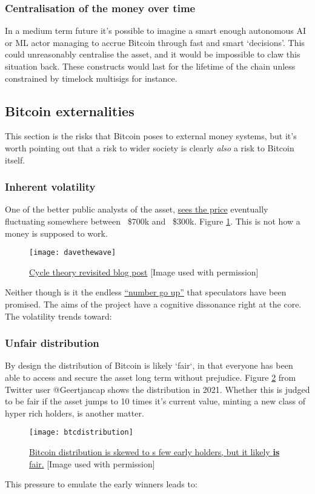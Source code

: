 \subsubsection{Centralisation of the money over time}
In a medium term future it's possible to imagine a smart enough autonomous AI or ML actor managing to accrue Bitcoin through fast and smart `decisions'. This could unreasonably centralise the asset, and it would be impossible to claw this situation back. These constructs would last for the lifetime of the chain unless constrained by timelock multisigs for instance. 
\subsection{Bitcoin externalities}
This section is the risks that Bitcoin poses to external money systems, but it's worth pointing out that a risk to wider society is clearly \textit{also} a risk to Bitcoin itself.
\subsubsection{Inherent volatility}
One of the better public analysts of the asset, \href{https://twitter.com/davthewave/status/1072441941390974982/photo/1}{sees the price} eventually fluctuating somewhere between ~\$700k and ~\$300k.  Figure \ref{fig:davethewave}. This is not how a money is supposed to work.  

\begin{figure}
  \centering
    \texttt{[image: davethewave]}
  \caption{\href{https://davethewave.substack.com/p/cycle-theory-revisited?s=r}{Cycle theory revisited blog post} [Image used with permission]}
  \label{fig:davethewave}
\end{figure}

Neither though is it the endless \href{https://stephanlivera.com/episode/147/}{``number go up''} that speculators have been promised. The aims of the project have a cognitive dissonance right at the core. The volatility trends toward:
\subsubsection{Unfair distribution}
By design the distribution of Bitcoin is likely `fair`, in that everyone has been able to access and secure the asset long term without prejudice. Figure \ref{fig:btcdistribution} from Twitter user @Geertjancap shows the distribution in 2021. Whether this is judged to be fair if the asset jumps to 10 times it's current value, minting a new class of hyper rich holders, is another matter. 
\begin{figure}
  \centering
    \texttt{[image: btcdistribution]}
  \caption{\href{https://twitter.com/Geertjancap/status/1380972132990136322/photo/1}{Bitcoin distribution is skewed to s few early holders, but it likely \textbf{is} fair.} [Image used with permission]}
  \label{fig:btcdistribution}
\end{figure}
This pressure to emulate the early winners leads to:
